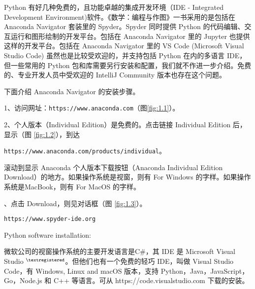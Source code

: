 \documentclass[main.tex]{subfiles}
\begin{document}
	
Python 有好几种免费的，且功能卓越的集成开发环境（IDE - Integrated Development Environment)软件。《数学：编程与作图》一书采用的是包括在
Anaconda Navigator  套装里的 Spyder。Spyder 同时提供 Python 的代码编辑、交互运行和图形绘制的开发平台。包括在 Anaconda Navigator 里的 Jupyter 也提供这样的开发平台。包括在 Anaconda Navigator 里的 VS Code (Microsoft Visual Studio Code) 虽然也是比较受欢迎的，并支持包括 Python 在内的多语言 IDE，但一些常用的 Python 包和库需要另行安装和配置，我们就不作进一步介绍。免费的、专业开发人员中受欢迎的 IntelliJ Community 版本也存在这个问题。

下面介绍 Anaconda Navigator 的安装步骤。

1、访问网址：\texttt{https://www.anaconda.com}（图\ref{fig:1.1}）。


2、个人版本（Individual Edition）是免费的。点击链接 Individual Edition  后，显示（图 \ref{fig:1.2}），到达

\texttt{https://www.anaconda.com/products/individual}。


滚动到显示 Anaconda 个人版本下载按钮（Anaconda Individual Edition Download）的地方。如果操作系统是视窗，则有 For Windows 的字样。如果操作系统是MacBook，则有 For MacOS 的字样。

、点击 Download，则见对话框（图 \ref{fig:1.3}）。


\verb|https://www.spyder-ide.org|

Python software installation:



微软公司的视窗操作系统的主要开发语言是C\#，其 IDE 是 Microsoft Visual Studio ${}^{\textregistered}$。但他们也有一个免费的轻巧 IDE，叫做 Visual Studio Code，有 Windows, Linux and macOS 版本，支持 Python，Java，JavaScript，Go，Node.js 和 C++ 等语言。可从
https://code.visualstudio.com
下载的安装。
\end{document}
